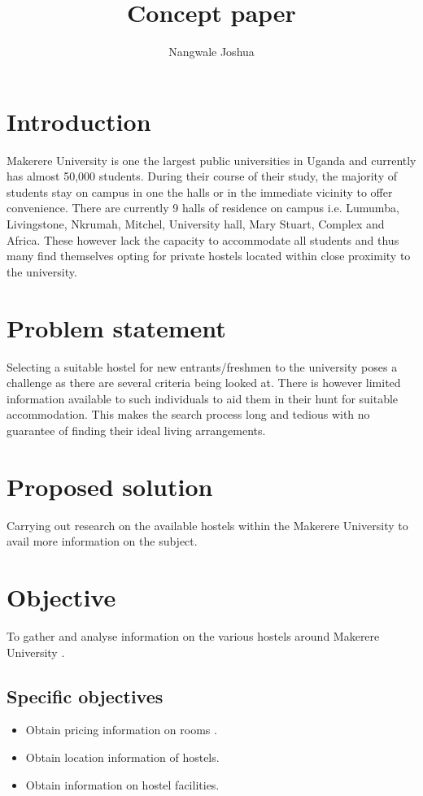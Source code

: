 \documentclass{article}
\begin{document}
\title{Concept paper}
\author{Nangwale Joshua}
\maketitle

\section{Introduction}
Makerere University is one the largest public universities in Uganda and currently has almost 50,000 students. During their course of their study, the majority of students stay on campus in one the halls or in the immediate vicinity to offer convenience. There are currently 9 halls of residence on campus i.e. Lumumba, Livingstone, Nkrumah, Mitchel, University hall, Mary Stuart, Complex and Africa. These however lack the capacity to accommodate all students and thus many find themselves opting for private hostels located within close proximity to the university.

\section{Problem statement}
Selecting a suitable hostel for new entrants/freshmen to the university poses a challenge as there are several criteria being looked at. There is however limited information available to such individuals to aid them in their hunt for suitable accommodation. This makes the search process long and tedious with no guarantee of finding their ideal living arrangements.

\section{Proposed solution}
Carrying out research on the available hostels within the Makerere University to avail more information on the subject.

\section{Objective}
To gather and analyse information on the various hostels around  Makerere University .

\subsection{Specific objectives}
\begin{itemize}
\item Obtain pricing information on rooms .
\item Obtain location information of hostels.
\item Obtain information on hostel facilities.
\end{itemize}
\end{document}
